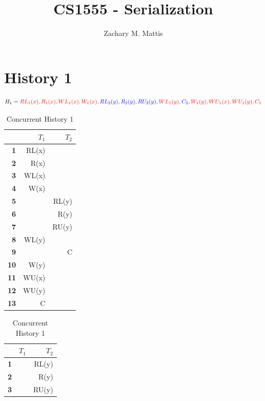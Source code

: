 \documentclass[12pt, letterpaper]{report}
\title{CS1555 - Serialization}
\author{Zachary M. Mattis}
\begin{document}
\maketitle

\section{History 1}


\[ H_1 = \color{red} RL_1(x), R_1(x), WL_1(x), W_1(x), \color{blue} RL_2(y), R_2(y), RU_2(y), \color{red} WL_1(y), \color{blue} C_2, \color{red} W_1(y), WU_1(x), WU_1(y), C_1 \]


\begin{table}[H]
	\centering
	\setlength\tabcolsep{4pt}
	\begin{minipage}{0.48\textwidth}
		\centering
		\begin{tabular}{ |r|r|r| }
			\hline
			& \textbf{$T_1$} & \textbf{$T_2$} \\
			\hline
			\textbf{1} & RL(x) & \\
			\hline
			\textbf{2} & R(x) & \\
			\hline
			\textbf{3} & WL(x) & \\
			\hline
			\textbf{4} & W(x) & \\
			\hline
			\textbf{5} & & RL(y) \\
			\hline
			\textbf{6} & & R(y) \\
			\hline
			\textbf{7} & & RU(y) \\
			\hline
			\textbf{8} & WL(y) & \\
			\hline
			\textbf{9} & & C \\
			\hline
			\textbf{10} & W(y) & \\
			\hline
			\textbf{11} & WU(x) & \\
			\hline
			\textbf{12} & WU(y) & \\
			\hline
			\textbf{13} & C & \\
			\hline
		\end{tabular}
		\caption{Concurrent History 1}
	\end{minipage}
	\hfill
	\begin{minipage}{0.48\textwidth}
	\centering
	\begin{tabular}{ |r|r|r| }
		\hline
		& \textbf{$T_1$} & \textbf{$T_2$} \\
		\hline
		\textbf{1} & & RL(y) \\
		\hline
		\textbf{2} & & R(y) \\
		\hline
		\textbf{3} & & RU(y) \\

\end{tabular}
\end{minipage}
\end{table}
\end{document}
